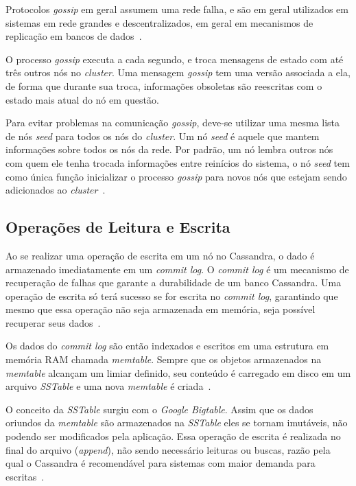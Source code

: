 Protocolos \emph{gossip} em geral assumem uma rede falha, e são em geral utilizados em sistemas em rede grandes e descentralizados, em geral em mecanismos de replicação em bancos de dados~\cite{cassandraguide}. 

O processo \emph{gossip} executa a cada segundo, e troca mensagens de estado com até três outros nós no \emph{cluster}. Uma mensagem \emph{gossip} tem uma versão associada a ela, de forma que durante sua troca, informações obsoletas são reescritas com o estado mais atual do nó em questão.

Para evitar problemas na comunicação \emph{gossip}, deve-se utilizar uma mesma lista de nós \emph{seed} para todos os nós do \emph{cluster}. Um nó \emph{seed} é aquele que mantem informações sobre todos os nós da rede. Por padrão, um nó lembra outros nós com quem ele tenha trocada informações entre reinícios do sistema, o nó \emph{seed} tem como única função inicializar o processo \emph{gossip} para novos nós que estejam sendo adicionados ao \emph{cluster}~\cite{cassandradocs}.


\subsection{Operações de Leitura e Escrita}

Ao se realizar uma operação de escrita em um nó no Cassandra, o dado é armazenado imediatamente em um \emph{commit log}. O \emph{commit log} é um mecanismo de recuperação de falhas que garante a durabilidade de um banco Cassandra. Uma operação de escrita só terá sucesso se for escrita no \emph{commit log}, garantindo que mesmo que essa operação não seja armazenada em memória, seja possível recuperar seus dados~\cite{cassandraguide}. 

Os dados do \emph{commit log} são então indexados e escritos em uma estrutura em memória RAM chamada \emph{memtable}. Sempre que os objetos armazenados na \emph{memtable} alcançam um limiar definido, seu conteúdo é carregado em disco em um arquivo \emph{SSTable} e uma nova \emph{memtable} é criada~\cite{cassandraguide, cassandradocs}. 

O conceito da \emph{SSTable} surgiu com o \emph{Google Bigtable}. Assim que os dados oriundos da \emph{memtable} são armazenados na \emph{SSTable} eles se tornam imutáveis, não podendo ser modificados pela aplicação. Essa operação de escrita é realizada no final do arquivo (\emph{append}), não sendo necessário leituras ou buscas, razão pela qual o Cassandra é recomendável para sistemas com maior demanda para escritas~\cite{cassandraguide, cassandradocs}.

